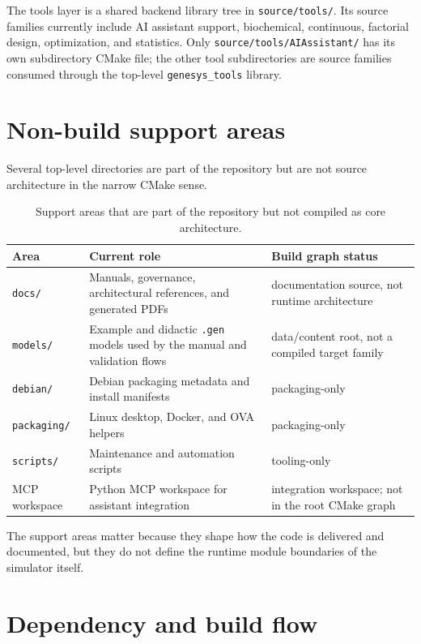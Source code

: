 The tools layer is a shared backend library tree in \texttt{source/tools/}.
Its source families currently include AI assistant support, biochemical,
continuous, factorial design, optimization, and statistics. Only
\texttt{source/tools/AIAssistant/} has its own subdirectory CMake file; the
other tool subdirectories are source families consumed through the top-level
\texttt{genesys\_tools} library.

\section{Non-build support areas}
\label{sec:repo-support-areas}

Several top-level directories are part of the repository but are not source
architecture in the narrow CMake sense.

\begin{table}[htbp]
\centering
\caption{Support areas that are part of the repository but not compiled as core architecture.}
\label{tab:repo-support-areas}
\small
\begin{tabular}{|p{3.2cm}|p{4.5cm}|p{4.5cm}|}
\hline
\textbf{Area} & \textbf{Current role} & \textbf{Build graph status} \\
\hline
\texttt{docs/} & Manuals, governance, architectural references, and generated PDFs & documentation source, not runtime architecture \\
\hline
\texttt{models/} & Example and didactic \texttt{.gen} models used by the manual and validation flows & data/content root, not a compiled target family \\
\hline
\texttt{debian/} & Debian packaging metadata and install manifests & packaging-only \\
\hline
\texttt{packaging/} & Linux desktop, Docker, and OVA helpers & packaging-only \\
\hline
\texttt{scripts/} & Maintenance and automation scripts & tooling-only \\
\hline
MCP workspace & Python MCP workspace for assistant integration & integration workspace; not in the root CMake graph \\
\hline
\end{tabular}
\end{table}

The support areas matter because they shape how the code is delivered and
documented, but they do not define the runtime module boundaries of the
simulator itself.

\section{Dependency and build flow}
\label{sec:repo-dependency-build-flow}


